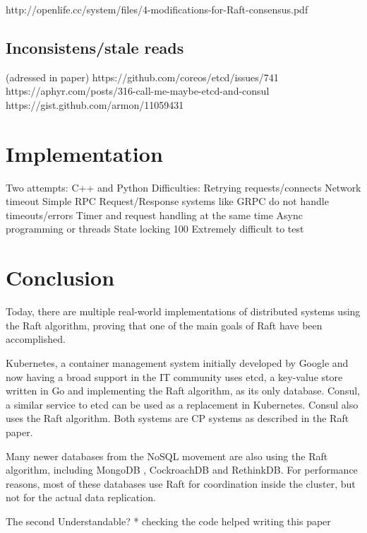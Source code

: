 http://openlife.cc/system/files/4-modifications-for-Raft-consensus.pdf

\subsection{Inconsistens/stale reads}
(adressed in paper)
https://github.com/coreos/etcd/issues/741
https://aphyr.com/posts/316-call-me-maybe-etcd-and-consul
https://gist.github.com/armon/11059431

\section{Implementation}



Two attempts: C++ and Python
Difficulties:
Retrying requests/connects
Network timeout
Simple RPC Request/Response systems like GRPC do not handle timeouts/errors 
Timer and request handling at the same time
Async programming or threads
State locking
100%
Extremely difficult to test

\section{Conclusion}
Today, there are multiple real-world implementations of distributed systems using the Raft algorithm, proving that one of the main goals of Raft have been accomplished.

Kubernetes, a container management system initially developed by Google and now having a broad support in the IT community uses etcd, a key-value store written in Go and implementing the Raft algorithm, as its only database. Consul, a similar service to etcd can be used as a replacement in Kubernetes. Consul also uses the Raft algorithm.
Both systems are CP systems as described in the Raft paper.

Many newer databases from the NoSQL movement are also using the Raft algorithm, including MongoDB \cite{mongodb_raft}, CockroachDB\cite{cockroachdb_raft} and RethinkDB\cite{rethinkdb_raft}. For performance reasons, most of these databases use Raft for coordination inside the cluster, but not for the actual data replication\cite[Development section]{rethinkdb_raft_metadata}.

The second 
Understandable?
* checking the code helped writing this paper


 


